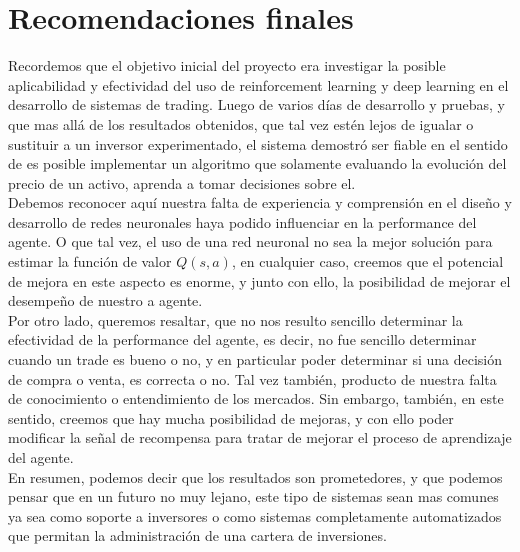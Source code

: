 \chapter{Recomendaciones finales}

Recordemos que el objetivo inicial del proyecto era investigar la posible aplicabilidad y efectividad del uso de reinforcement learning y deep learning en el desarrollo de sistemas de trading. Luego de varios días de desarrollo y pruebas, y que mas allá de los resultados obtenidos, que tal vez estén lejos de igualar o sustituir a un inversor experimentado, el sistema demostró ser fiable en el sentido de es posible implementar un algoritmo que solamente evaluando la evolución del precio de un activo, aprenda a tomar decisiones sobre el.\\

Debemos reconocer aquí nuestra falta de experiencia y comprensión en el diseño y desarrollo de redes neuronales haya podido influenciar en la performance del agente. O que tal vez, el uso de una red neuronal no sea la mejor solución para estimar la función de valor $Q(s, a)$, en cualquier caso, creemos que el potencial de mejora en este aspecto es enorme, y junto con ello, la posibilidad de mejorar el desempeño de nuestro a agente.\\

Por otro lado, queremos resaltar, que no nos resulto sencillo determinar la efectividad de la performance del agente, es decir, no fue sencillo determinar cuando un trade es bueno o no, y en particular poder determinar si una decisión de compra o venta, es correcta o no. Tal vez también, producto de nuestra falta de conocimiento o entendimiento de los mercados.
Sin embargo, también, en este sentido, creemos que hay mucha posibilidad de mejoras, y con ello poder modificar la señal de recompensa para tratar de mejorar el proceso de aprendizaje del agente.\\

En resumen, podemos decir que los resultados son prometedores, y que podemos pensar que en un futuro no muy lejano, este tipo de sistemas sean mas comunes ya sea como soporte a inversores o como sistemas completamente automatizados que permitan la administración de una cartera de inversiones.